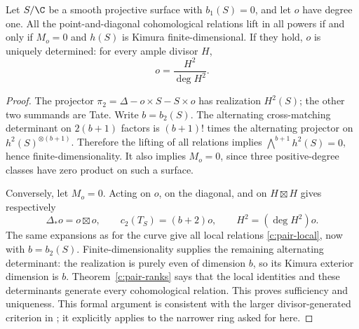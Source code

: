 \begin{proposition}
\label{c:surface-chow-criterion}
Let $S/\C$ be a smooth projective surface with $b_1(S)=0$, and let $o$ have degree one. All the point-and-diagonal cohomological relations lift in all powers if and only if $M_o=0$ and $h(S)$ is Kimura finite-dimensional. If they hold, $o$ is uniquely determined: for every ample divisor $H$,
\[
 o=\frac{H^2}{\deg H^2}.
\]
\end{proposition}

\begin{proof}
The projector $\pi_2=\Delta-o\times S-S\times o$ has realization $H^2(S)$; the other two summands are Tate. Write $b=b_2(S)$. The alternating cross-matching determinant on $2(b+1)$ factors is $(b+1)!$ times the alternating projector on $h^2(S)^{\otimes(b+1)}$. Therefore the lifting of all relations implies $\bigwedge^{b+1}h^2(S)=0$, hence finite-dimensionality. It also implies $M_o=0$, since three positive-degree classes have zero product on such a surface.

Conversely, let $M_o=0$. Acting on $o$, on the diagonal, and on $H\boxtimes H$ gives respectively
\[
 \Delta_*o=o\boxtimes o,\qquad c_2(T_S)=(b+2)o,
 \qquad H^2=(\deg H^2)o.
\]
The same expansions as for the curve give all local relations \eqref{c:pair-local}, now with $b=b_2(S)$. Finite-dimensionality supplies the remaining alternating determinant: the realization is purely even of dimension $b$, so its Kimura exterior dimension is $b$. Theorem~\ref{c:pair-ranks} says that the local identities and these determinants generate every cohomological relation. This proves sufficiency and uniqueness. This formal argument is consistent with the larger divisor-generated criterion in \citet[Proposition 4.5]{c_fulaterveervial2021}; it explicitly applies to the narrower ring asked for here.
\end{proof}

